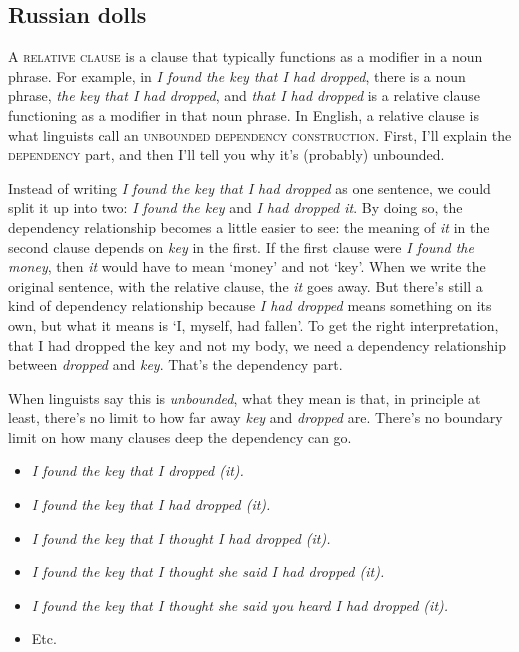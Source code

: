 \subsection{Russian dolls} \label{sec:dolls}

A \textsc{relative clause} is a clause that typically functions as a modifier in a noun phrase. For example, in \textit{I found the key that I had dropped}, there is a noun phrase, \textit{the key that I had dropped}, and \textit{that I had dropped} is a relative clause functioning as a modifier in that noun phrase. In English, a relative clause is what linguists call an \textsc{unbounded dependency construction}. First, I'll explain the \textsc{dependency} part, and then I'll tell you why it's (probably) unbounded.

Instead of writing \textit{I found the key that I had dropped} as one sentence, we could split it up into two: \textit{I found the key} and \textit{I had dropped it}. By doing so, the dependency relationship becomes a little easier to see: the meaning of \textit{it} in the second clause depends on \textit{key} in the first. If the first clause were \textit{I found the money}, then \textit{it} would have to mean `money' and not `key'. When we write the original sentence, with the relative clause, the \textit{it} goes away. But there's still a kind of dependency relationship because \textit{I had dropped} means something on its own, but what it means is `I, myself, had fallen'. To get the right interpretation, that I had dropped the key and not my body, we need a dependency relationship between \textit{dropped} and \textit{key}. That's the dependency part.

When linguists say this is \textit{unbounded}, what they mean is that, in principle at least, there's no limit to how far away \textit{key} and \textit{dropped} are. There's no boundary limit on how many clauses deep the dependency can go.
\begin{itemize}
    \item \textit{I found the key that I dropped (it).}
    \item \textit{I found the key that I had dropped (it).}
    \item \textit{I found the key that I thought I had dropped (it).}
    \item \textit{I found the key that I thought she said I had dropped (it).}
    \item \textit{I found the key that I thought she said you heard I had dropped (it).}
    \item Etc.
\end{itemize}

